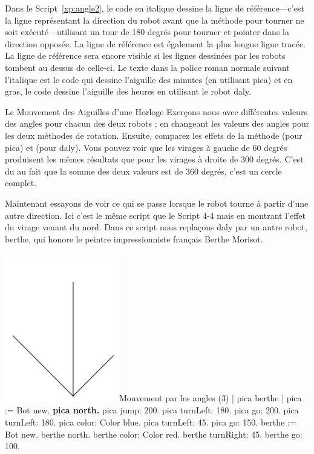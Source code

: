 \documentclass[a4paper,10pt,twoside]{book}
\begin{document}
Dans le Script~\ref{xp:angle2}, le code en italique dessine la ligne de r\'ef\'erence—c'est la ligne 
repr\'esentant la direction du robot avant que la m\'ethode pour tourner ne soit ex\'ecut\'e—utilisant un tour de 180 degr\'es 
pour tourner et pointer dans la direction oppos\'ee. La ligne de r\'ef\'erence est \'egalement la plus longue ligne trac\'ee. La ligne 
de r\'ef\'erence sera encore visible si les lignes dessin\'ees par les robots tombent au dessus de celle-ci. Le texte 
dans la police roman normale suivant l'italique est le code qui dessine l'aiguille des minutes 
(en utilisant pica) et en gras, le code dessine l'aiguille des heures en utilisant le robot daly.

\begin{exonofigtitle}{Le Mouvement des Aiguilles d'une Horloge}
Exerçons nous avec diff\'erentes valeurs des angles pour chacun des deux robots ; en changeant les valeurs des angles 
pour les deux m\'ethodes de rotation. Ensuite, comparez les effets de la m\'ethode  (pour pica) et  (pour daly). 
Vous pouvez voir que les virages \`a gauche de 60 degr\'es produisent les m\^emes r\'esultats que pour les virages \`a droite de 300 degr\'es. C'est du au fait 
que la somme des deux valeurs est de 360 degr\'es, c'est un cercle complet.
\end{exonofigtitle}


Maintenant essayons de voir ce qui se passe lorsque le robot tourne \`a partir d'une autre direction. Ici c'est 
le m\^eme script que le Script 4-4 mais en montrant l'effet du virage venant du nord. Dans ce script nous replaçons 
daly par un autre robot, berthe, qui honore le peintre impressionniste français Berthe Morisot.


\begin{scriptfigwithsize}[0.4]{\includegraphics[width=5cm]{threeAngles}}{Mouvement par les  angles (3)}\label{xp:angle3}
	| pica berthe | 
	pica := Bot new. 
	\textbf{pica north.}
	pica jump: 200. 
	pica turnLeft: 180. 
	pica go: 200. 
	pica turnLeft: 180. 
	pica color: Color blue. 
	pica turnLeft: 45. 
	pica go: 150. 
	berthe := Bot new. 
	berthe north. 
	berthe color: Color red. 
	berthe turnRight: 45. 
	berthe go: 100. 
\end{scriptfigwithsize}
\end{document}
